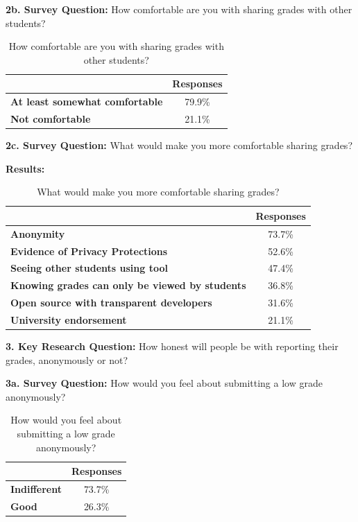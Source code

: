 \textbf{2b. Survey Question:} How comfortable are you with sharing grades with other students?
\smallskip

\begin{table}[H]
\centering
\begin{tabular}{@{}lc@{}}
\toprule
                  & {\textbf{Responses}}  \\ \midrule
\textbf{At least somewhat comfortable}    & 79.9\%    \\
\textbf{Not comfortable}     & 21.1\%    \\ \bottomrule
\end{tabular}
\caption{How comfortable are you with sharing grades with other students?}
\label{survey2b}
\end{table}

\textbf{2c. Survey Question:} What would make you more comfortable sharing grades?
\smallskip

\textbf{Results:}

\begin{table}[H]
\centering
\begin{tabular}{@{}lc@{}}
\toprule
                  & {\textbf{Responses}}  \\ \midrule
\textbf{Anonymity}    & 73.7\%    \\
\textbf{Evidence of Privacy Protections}     & 52.6\% \\
\textbf{Seeing other students using tool}     & 47.4\% \\
\textbf{Knowing grades can only be viewed by students}     & 36.8\% \\
\textbf{Open source with transparent developers}     & 31.6\% \\
\textbf{University endorsement}     & 21.1\%\\ \bottomrule
\end{tabular}
\caption{What would make you more comfortable sharing grades?}
\label{survey2c}
\end{table}

\textbf{3. Key Research Question:} How honest will people be with reporting their grades, anonymously or not?
\smallskip

\textbf{3a. Survey Question:} How would you feel about submitting a low grade anonymously?
\smallskip

\begin{table}[H]
\centering
\begin{tabular}{@{}lc@{}}
\toprule
                  & {\textbf{Responses}}  \\ \midrule
\textbf{Indifferent}    & 73.7\%    \\
\textbf{Good}     & 26.3\%    \\ \bottomrule
\end{tabular}
\caption{How would you feel about submitting a low grade anonymously?}
\label{survey3a}
\end{table}


